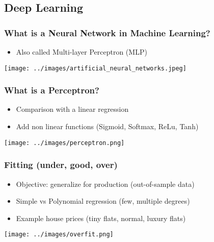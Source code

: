 
\subsection{Deep Learning}


\begin{frame}[fragile]
   \frametitle{What is a Neural Network in Machine Learning?}
   \begin{itemize}
      \item Also called Multi-layer Perceptron (MLP)
   \end{itemize}
   \begin{center}
      \texttt{[image: ../images/artificial\_neural\_networks.jpeg]}
   \end{center}
\end{frame}


\begin{frame}[fragile]
   \frametitle{What is a Perceptron?}
   \begin{itemize}
      \item Comparison with a linear regression
      \item Add non linear functions (Sigmoid, Softmax, ReLu, Tanh)
   \end{itemize}
   \begin{center}
      \texttt{[image: ../images/perceptron.png]}
   \end{center}
\end{frame}


\begin{frame}[fragile]
   \frametitle{Fitting (under, good, over)}
   \begin{itemize}
      \item Objective: generalize for production (out-of-sample data)
      \item Simple vs Polynomial regression (few, multiple degrees)
      \item Example house prices (tiny flats, normal, luxury flats)
   \end{itemize}
   \begin{center}
      \texttt{[image: ../images/overfit.png]}
   \end{center}
\end{frame}


